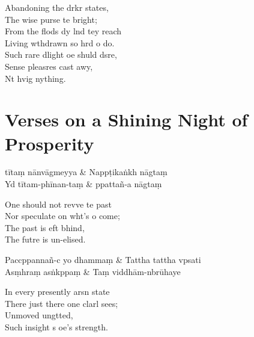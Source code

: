 \begin{english}
  Abandoning the drkr states,\\
  The wise purse te bright;\\
  From the flods dy lnd tey reach\\
  Living wthdrawn so hrd o do.\\
  Such rare dlight oe shuld dsre,\\
  Sense pleasres cast awy,\\
  Nt hvig nything.
\end{english}

\chapter{Verses on a Shining Night of Prosperity}%

\begin{leader}
\end{leader}

\begin{twochants}
  tītaṃ nānvāgmeyya & Nappṭikaṅkh nāgtaṃ \\
  Yd tītam-phīnan-taṃ & ppattañ-a nāgtaṃ \\
\end{twochants}

\begin{english}
  One should not revve te past\\
  Nor speculate on wht's o come;\\
  The past is eft bhind,\\
  The futre is un-elised.
\end{english}

\begin{twochants}
  Paccppannañ-c yo dhammaṃ & Tattha tattha vpsati \\
  Asṃhraṃ asṅkppaṃ & Taṃ viddhām-nbrūhaye \\
\end{twochants}

\begin{english}
  In every presently arsn state\\
  There just there one clarl sees;\\
  Unmoved ungtted,\\
  Such insight s oe's strength.
\end{english}


